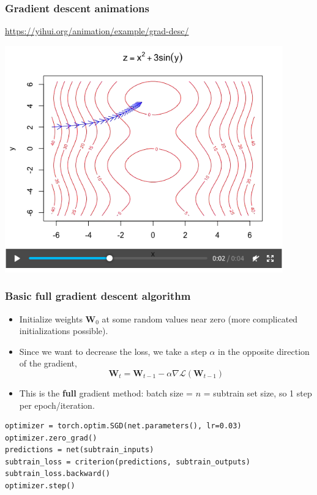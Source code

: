 \documentclass{beamer}
\begin{document}
\begin{frame}
  \frametitle{Gradient descent animations}
  \url{https://yihui.org/animation/example/grad-desc/}

  \includegraphics[width=0.9\textwidth]{screenshot-gradient-descent}
\end{frame}

\begin{frame}[fragile]
  \frametitle{Basic full gradient descent algorithm}
  \begin{itemize}
  \item Initialize weights $\mathbf W_0$ at some random values near
    zero (more complicated initializations possible).
  \item Since we want to decrease the loss, we take a step $\alpha$ in the
    opposite direction of the gradient,
  $$
\mathbf W_t = \mathbf W_{t-1} - \alpha \nabla \mathcal L(\mathbf W_{t-1})
$$
\item This is the \textbf{full} gradient method: batch size = $n$ =
  subtrain set size, so 1 step per epoch/iteration.
\end{itemize}

\begin{verbatim}
optimizer = torch.optim.SGD(net.parameters(), lr=0.03)
optimizer.zero_grad()
predictions = net(subtrain_inputs)
subtrain_loss = criterion(predictions, subtrain_outputs)
subtrain_loss.backward()
optimizer.step()
\end{verbatim}
\end{frame}
\end{document}
